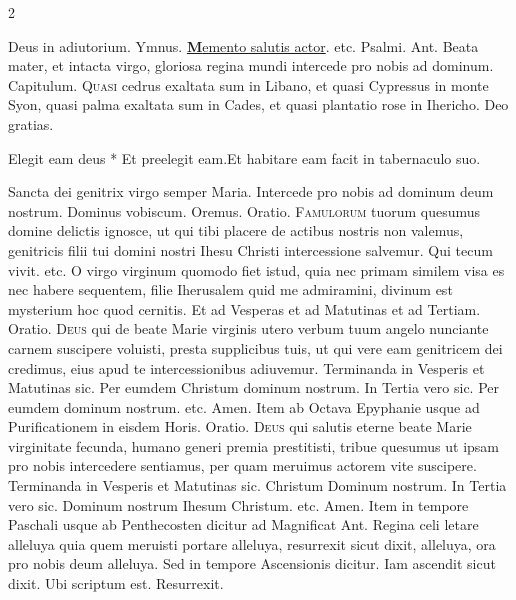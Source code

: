 \begin{multicols*}{2}
\par \noindent Deus in adiutorium. {\color{Red} Ymnus.} \hyperlink{memento-salutis}{{\bfseries \color{Red} M}emento salutis actor}. etc. {\color{Red} Psalmi.}
{\color{Red} Ant.} Beata mater, et intacta virgo, gloriosa regina mundi intercede pro nobis ad dominum. {\color{Red} Capitulum.}
\lettrine[lines=2]{\zallmancaps \color{Red} Q}{uasi} cedrus exaltata sum in Libano, et quasi Cypressus in monte Syon, quasi palma exaltata sum in Cades, et quasi plantatio rose in Ihericho. Deo gratias.
\begin{responsory-breve}
{Elegit eam deus * Et preelegit eam.}{Et habitare eam facit in tabernaculo suo.}
\end{responsory-breve}%
\V Sancta dei genitrix virgo semper Maria. \R Intercede pro nobis ad dominum deum nostrum. Dominus vobiscum. {\color{Red} Oremus. Oratio.}
\lettrine[lines=2]{\zallmancaps \color{Blue} F}{amulorum} tuorum quesumus domine delictis ignosce, ut qui tibi placere de actibus nostris non valemus, genitricis filii tui domini nostri Ihesu Christi intercessione salvemur. Qui tecum vivit. etc.
 O virgo virginum quomodo fiet istud, quia nec primam similem visa es nec habere sequentem, filie Iherusalem quid me admiramini, divinum est mysterium hoc quod cernitis. {\color{Red} Et ad Vesperas et ad Matutinas et ad Tertiam. Oratio.}
\lettrine[lines=2]{\zallmancaps \color{Red} D}{eus} qui de beate Marie virginis utero verbum tuum angelo nunciante carnem suscipere voluisti, presta supplicibus tuis, ut qui vere eam genitricem dei credimus, eius apud te intercessionibus adiuvemur.
{\color{Red} Terminanda in Vesperis et Matutinas sic.} Per eumdem Christum dominum nostrum. {\color{Red} In Tertia vero sic.} Per eumdem dominum nostrum. etc. Amen. {\color{Red} Item ab Octava Epyphanie usque ad Purificationem in eisdem Horis. Oratio.}
\lettrine[lines=2]{\zallmancaps \color{Blue} D}{eus} qui salutis eterne beate Marie virginitate fecunda, humano generi premia prestitisti, tribue quesumus ut ipsam pro nobis intercedere sentiamus, per quam meruimus actorem vite suscipere.
{\color{Red} Terminanda in Vesperis et Matutinas sic.} Christum Dominum nostrum. {\color{Red} In Tertia vero sic.} Dominum nostrum Ihesum Christum. etc. Amen. {\color{Red} Item in tempore Paschali usque ab Penthecosten dicitur ad Magnificat Ant.} Regina celi letare alleluya quia quem meruisti portare alleluya, resurrexit sicut dixit, alleluya, ora pro nobis deum alleluya.
{\color{Red} Sed in tempore Ascensionis dicitur.} Iam ascendit sicut dixit. {\color{Red} Ubi scriptum est.} Resurrexit.


\end{multicols*}


